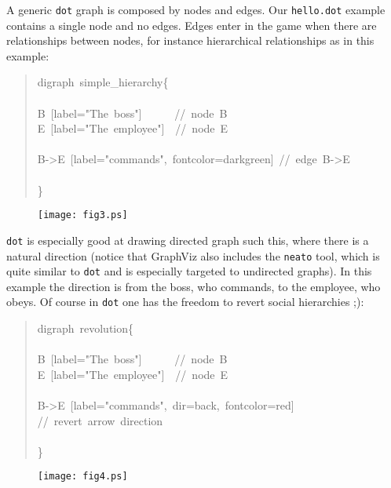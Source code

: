 \documentclass[10pt,english]{article}
\begin{document}
A generic \texttt{dot} graph is composed by nodes and edges.
Our \texttt{hello.dot} example contains a single node and no edges.
Edges enter in the game when there are relationships between nodes,
for instance hierarchical relationships as in this example:
\begin{quote}
\begin{ttfamily}\begin{flushleft}
\mbox{digraph~simple{\_}hierarchy{\{}}\\
\mbox{}\\
\mbox{B~[label="The~boss"]~~~~~~//~node~B}\\
\mbox{E~[label="The~employee"]~~//~node~E}\\
\mbox{}\\
\mbox{B->E~[label="commands",~fontcolor=darkgreen]~//~edge~B->E}\\
\mbox{}\\
\mbox{{\}}}
\end{flushleft}\end{ttfamily}
\end{quote}
\begin{figure}

\texttt{[image: fig3.ps]}
\end{figure}

\texttt{dot} is especially good at drawing directed graph such this, where
there is a natural direction (notice that GraphViz  also includes the \texttt{neato}
tool, which is quite similar to \texttt{dot} and is especially targeted to 
undirected graphs). 
In this example the direction is from the boss, who commands, 
to the employee, who obeys. Of course in \texttt{dot} one has the freedom 
to revert social hierarchies ;):
\begin{quote}
\begin{ttfamily}\begin{flushleft}
\mbox{digraph~revolution{\{}}\\
\mbox{}\\
\mbox{B~[label="The~boss"]~~~~~~//~node~B}\\
\mbox{E~[label="The~employee"]~~//~node~E}\\
\mbox{}\\
\mbox{B->E~[label="commands",~dir=back,~fontcolor=red]~~}\\
\mbox{//~revert~arrow~direction~}\\
\mbox{}\\
\mbox{{\}}}
\end{flushleft}\end{ttfamily}
\end{quote}
\begin{figure}

\texttt{[image: fig4.ps]}
\end{figure}
\end{document}

